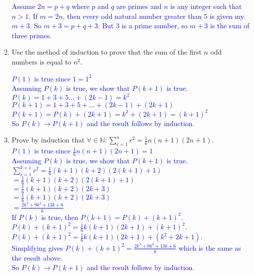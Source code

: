 \documentclass[13.5pt]{article}
\begin{document}
\begin{enumerate}
\textcolor{blue} {Assume \(2n=p+q\) where \(p\) and \(q\) are primes and \(n\) is any integer such that \(n>1\). If \(m=2n\), then every odd natural number greater than \(5\) is given my \(m+3\). So \(m+3=p+q+3\). But \(3\) is a prime number, so \(m+3\) is the sum of three primes.}

\item{Use the method of induction to prove that the sum of the first \(n\) odd numbers is equal to \(n^2\).}

\textcolor{blue} {\(P(1)\) is true since \(1=1^2\)}\\
\textcolor{blue} {Assuming \(P(k)\) is true, we show that \( P(k+1) \) is true.}\\
\textcolor{blue} {\(P(k)=1+3+5...+(2k-1)=k^2\)}\\
\textcolor{blue} {\(P(k+1)=1+3+5+...+(2k-1)+(2k+1)\)}\\
\textcolor{blue} {\(P(k+1)=P(k)+(2k+1)=k^2+(2k+1)=(k+1)^2\)}\\
\textcolor{blue} {So \(P(k) \rightarrow P(k+1) \) and the result follows by induction.}

\item{Prove by induction that \(\forall \in \mathbb{N}: \sum_{r=1}^{n}r^2 = \frac{1}{6}n(n+1)(2n+1)\).}\\
\textcolor{blue} {\(P(1)\) is true since \(\frac{1}{6}n(n+1)(2n+1)=1\)}\\
\textcolor{blue} {Assuming \(P(k)\) is true, we show that \(P(k+1)\) is true.}\\
\textcolor{blue} {\(\sum_{r=1}^{k+1} r^2 = \frac{1}{6}(k+1)(k+2)(2(k+1)+1)\)}\\
\textcolor{blue} {\( = \frac{1}{6}(k+1)(k+2)(2(k+1)+1)\)}\\
\textcolor{blue} {\( = \frac{1}{6}(k+1)(k+2)(2k+3)\)}\\
\textcolor{blue} {\( = \frac{1}{6}(k+1)(k+2)(2k+3)\)}\\
\textcolor{blue} {\( = \frac{2k^3+9k^2+13k+6}{6}\)}\\
\textcolor{blue} {If \(P(k)\) is true, then \(P(k+1)=P(k)+(k+1)^2\).}\\
\textcolor{blue} {\(P(k)+(k+1)^2=\frac{1}{6}k(k+1)(2k+1)+(k+1)^2\).}\\
\textcolor{blue} {\(P(k)+(k+1)^2=\frac{1}{6}k(k+1)(2k+1)+(k^2+2k+1)\).}\\
\textcolor{blue} {Simplifying gives \(P(k)+(k+1)^2=\frac{2k^3+9k^2+13k+6}{6}\) which is the same as the result above.}\\
\textcolor{blue} {So \(P(k) \rightarrow P(k+1) \) and the result follows by induction.}
\end{enumerate}
\end{document}
